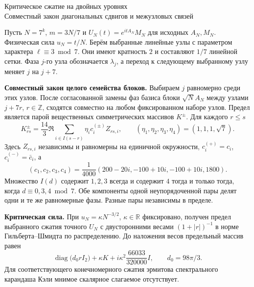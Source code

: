 \documentclass[11pt,a4paper]{article}
\newcommand{\R}{\mathbb R}
\newcommand{\Z}{\mathbb Z}
\newcommand{\subt}[1]{\par\medskip\noindent\textbf{#1.}\quad}
\begin{document}
\begin{center}{\LARGE\sffamily Критическое сжатие на двойных уровнях}\\[4pt]
{\large Совместный закон диагональных сдвигов и межузловых связей}
\end{center}
Пусть \(N=7^k\), \(m=3N/7\) и \(U_N(t)=e^{itA_N}M_N\) для исходных \(A_N,M_N\). Физическая сила \(u_N=t/N\). Берём выбранные линейные узлы с параметром характера \(\ell\equiv3\bmod7\). Они имеют кратность \(2\) и составляют \(1/7\) линейной сетки. Фаза \(j\)-го узла обозначается \(\lambda_j\), а переход к следующему выбранному узлу меняет \(j\) на \(j+7\).

\subt{Совместный закон целого семейства блоков}
Выбираем \(j\) равномерно среди этих узлов. После согласованной замены фаз базиса блоки \(\sqrt N A_N\) между узлами \(j+7r\), \(r\in\Z\), сходятся совместно на любом фиксированном наборе узлов. Предел является парой вещественных симметрических массивов \(K^\pm\). Для каждого \(r\le s\)
\[
 K^\pm_{rs}=\frac{14}{3}\Re\sum_{i\in I(s-r)}
              \eta_i c_i^{(\pm)} Z_{rs,i},
 \qquad (\eta_1,\eta_2,\eta_3,\eta_4)=(1,1,1,\sqrt7).
\]
Здесь \(Z_{rs,i}\) независимы и равномерны на единичной окружности, \(c_i^{(+)}=c_i\), \(c_i^{(-)}=\bar c_i\), а
\[
 (c_1,c_2,c_3,c_4)=\frac1{4000}(200-20i,-100+10i,-100+10i,1800).
\]
Множество \(I(d)\) содержит \(1,2,3\) всегда и содержит \(4\) тогда и только тогда, когда \(d\equiv0,3,4\bmod7\). Обе компоненты одной неупорядоченной пары делят одни и те же равномерные фазы. Разные пары независимы в пределе.

\subt{Критическая сила}
При \(u_N=\kappa N^{-3/2}\), \(\kappa\in\R\) фиксировано, получен предел выбранного сжатия точного \(U_N\) с двусторонними весами \((1+|r|)^{-1}\) в норме Гильберта--Шмидта по распределению. До наложения весов предельный массив равен
\[
       \operatorname{diag}\bigl(d_0 r I_2\bigr)+\kappa K
                      +i\kappa^2\frac{66033}{320000}I,\qquad d_0=98\pi/3.
\]
Для соответствующего конечномерного сжатия эрмитова спектрального карандаша Кэли мнимое скалярное слагаемое отсутствует.
\end{document}
